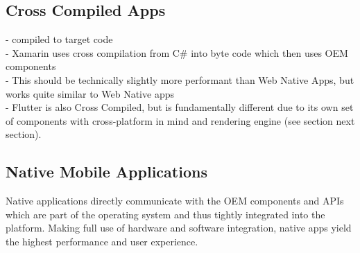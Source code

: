 \subsection{Cross Compiled Apps}
- compiled to target code\\
- Xamarin uses cross compilation from C\# into byte code which then uses OEM components\\
- This should be technically slightly more performant than Web Native Apps, but works quite similar to Web Native apps\\
- Flutter is also Cross Compiled, but is fundamentally different due to its own set of components with cross-platform in mind
and rendering engine (see section next section).\\

\subsection{Native Mobile Applications}
Native applications directly communicate with the OEM components and APIs which are part of the operating system and thus tightly integrated into the platform.
Making full use of hardware and software integration, native apps yield the highest performance and user experience.

